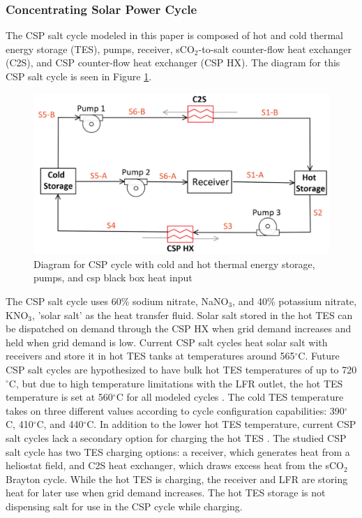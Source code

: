 \begin{paracol}{2}
\subsubsection{Concentrating Solar Power Cycle}

The CSP salt cycle modeled in this paper is composed of hot and cold thermal energy storage (TES), pumps, receiver, sCO$_2$-to-salt counter-flow heat exchanger (C2S), and CSP counter-flow heat exchanger (CSP HX). The diagram for this CSP salt cycle is seen in Figure \ref{csp}. 




\begin{figure}[H] 
    \widefigure
    \includegraphics[width=10 cm]{Definitions/csp.pdf}
    \caption{Diagram for CSP cycle with cold and hot thermal energy storage, pumps, and csp black box heat input\label{csp}}
\end{figure}

The CSP salt cycle uses 60\% sodium nitrate, NaNO$_3$, and 40\% potassium nitrate, KNO$_3$, 'solar salt' as the heat transfer fluid. Solar salt stored in the hot TES can be dispatched on demand through the CSP HX when grid demand increases and held when grid demand is low. Current CSP salt cycles heat solar salt with receivers and store it in hot TES tanks at temperatures around 565$^{\circ}$C. Future CSP salt cycles are hypothesized to have bulk hot TES temperatures of up to 720$^{\circ}$C, but due to high temperature limitations with the LFR outlet, the hot TES temperature is set at 560$^{\circ}$C for all modeled cycles \cite{mehos2017concentrating}. The cold TES temperature takes on three different values according to cycle configuration capabilities: 390$^{\circ}$C, 410$^{\circ}$C, and 440$^{\circ}$C. In addition to the lower hot TES temperature, current CSP salt cycles lack a secondary option for charging the hot TES \cite{hamilton2020dispatch}. The studied CSP salt cycle has two TES charging options: a receiver, which generates heat from a heliostat field, and C2S heat exchanger, which draws excess heat from the sCO$_2$ Brayton cycle. While the hot TES is charging, the receiver and LFR are storing heat for later use when grid demand increases. The hot TES storage is not dispensing salt for use in the CSP cycle while charging.


\end{paracol}
